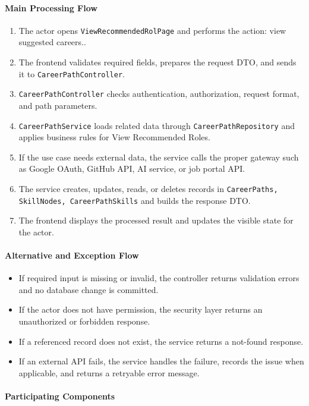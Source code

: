 \paragraph{Main Processing Flow}

\begin{enumerate}
    \item The actor opens \texttt{ViewRecommendedRolPage} and performs the action: view suggested careers..
    \item The frontend validates required fields, prepares the request DTO, and sends it to \texttt{CareerPathController}.
    \item \texttt{CareerPathController} checks authentication, authorization, request format, and path parameters.
    \item \texttt{CareerPathService} loads related data through \texttt{CareerPathRepository} and applies business rules for View Recommended Roles.
    \item If the use case needs external data, the service calls the proper gateway such as Google OAuth, GitHub API, AI service, or job portal API.
    \item The service creates, updates, reads, or deletes records in \texttt{CareerPaths, SkillNodes, CareerPathSkills} and builds the response DTO.
    \item The frontend displays the processed result and updates the visible state for the actor.
\end{enumerate}

\paragraph{Alternative and Exception Flow}

\begin{itemize}
    \item If required input is missing or invalid, the controller returns validation errors and no database change is committed.
    \item If the actor does not have permission, the security layer returns an unauthorized or forbidden response.
    \item If a referenced record does not exist, the service returns a not-found response.
    \item If an external API fails, the service handles the failure, records the issue when applicable, and returns a retryable error message.
\end{itemize}

\paragraph{Participating Components}

